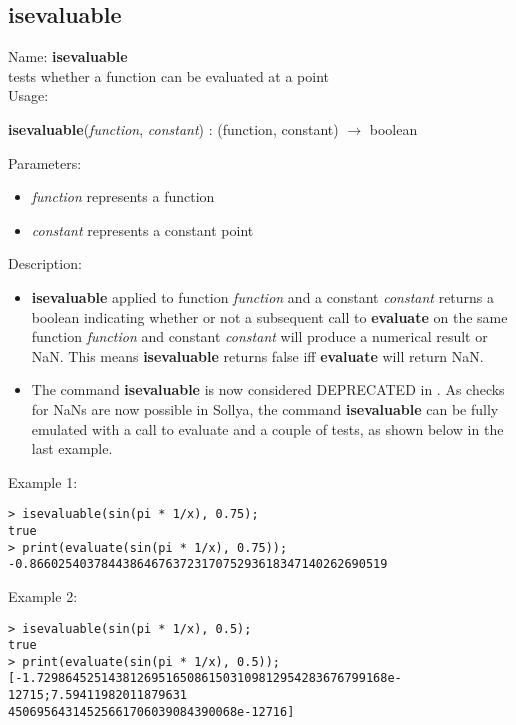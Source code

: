\subsection{isevaluable}
\label{labisevaluable}
\noindent Name: \textbf{isevaluable}\\
\phantom{aaa}tests whether a function can be evaluated at a point \\[0.2cm]
\noindent Usage: 
\begin{center}
\textbf{isevaluable}(\emph{function}, \emph{constant}) : (\textsf{function}, \textsf{constant}) $\rightarrow$ \textsf{boolean}\\
\end{center}
Parameters: 
\begin{itemize}
\item \emph{function} represents a function
\item \emph{constant} represents a constant point
\end{itemize}
\noindent Description: \begin{itemize}

\item \textbf{isevaluable} applied to function \emph{function} and a constant \emph{constant} returns
   a boolean indicating whether or not a subsequent call to \textbf{evaluate} on the
   same function \emph{function} and constant \emph{constant} will produce a numerical
   result or NaN. This means \textbf{isevaluable} returns false iff \textbf{evaluate} will return NaN.

\item The command \textbf{isevaluable} is now considered DEPRECATED in \sollya.
   As checks for NaNs are now possible in Sollya, the command \textbf{isevaluable}
   can be fully emulated with a call to evaluate and a couple of tests, 
   as shown below in the last example.
\end{itemize}
\noindent Example 1: 
\begin{center}\begin{minipage}{15cm}\begin{Verbatim}[frame=single,commandchars=\\\|\~]
> isevaluable(sin(pi * 1/x), 0.75);
true
> print(evaluate(sin(pi * 1/x), 0.75));
-0.86602540378443864676372317075293618347140262690519
\end{Verbatim}
\end{minipage}\end{center}
\noindent Example 2: 
\begin{center}\begin{minipage}{15cm}\begin{Verbatim}[frame=single,commandchars=\\\|\~]
> isevaluable(sin(pi * 1/x), 0.5);
true
> print(evaluate(sin(pi * 1/x), 0.5));
[-1.7298645251438126951650861503109812954283676799168e-12715;7.59411982011879631
45069564314525661706039084390068e-12716]
\end{Verbatim}
\end{minipage}\end{center}

